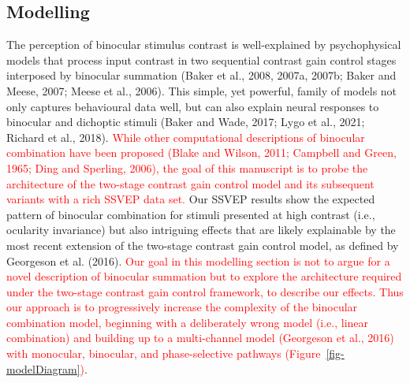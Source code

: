 \documentclass[review,
  12pt,
]{elsarticle}
\begin{document}
\subsection{Modelling}\label{modelling}

The perception of binocular stimulus contrast is well-explained by
psychophysical models that process input contrast in two sequential
contrast gain control stages interposed by binocular summation (Baker et
al., 2008, 2007a, 2007b; Baker and Meese, 2007; Meese et al., 2006).
This simple, yet powerful, family of models not only captures
behavioural data well, but can also explain neural responses to
binocular and dichoptic stimuli (Baker and Wade, 2017; Lygo et al.,
2021; Richard et al., 2018). \textcolor{red}{While other computational
descriptions of binocular combination have been proposed (Blake and
Wilson, 2011; Campbell and Green, 1965; Ding and Sperling, 2006), the
goal of this manuscript is to probe the architecture of the two-stage
contrast gain control model and its subsequent variants with a rich
SSVEP data set.} Our SSVEP results show the expected pattern of
binocular combination for stimuli presented at high contrast (i.e.,
ocularity invariance) but also intriguing effects that are likely
explainable by the most recent extension of the two-stage contrast gain
control model, as defined by Georgeson et al. (2016). \textcolor{red}{Our goal
in this modelling section is not to argue for a novel description of
binocular summation but to explore the architecture required under the
two-stage contrast gain control framework, to describe our effects. Thus
our approach is to progressively increase the complexity of the
binocular combination model, beginning with a deliberately wrong model
(i.e., linear combination) and building up to a multi-channel model
(Georgeson et al., 2016) with monocular, binocular, and phase-selective
pathways (Figure~\ref{fig-modelDiagram})}.
\end{document}
